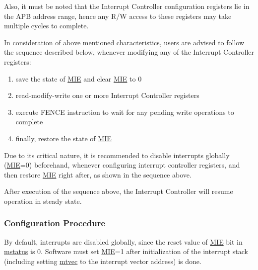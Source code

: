 \documentclass[main\_\_EN.tex]{subfiles}
\begin{document}
Also, it must be noted that the Interrupt Controller configuration registers lie in the APB address range, hence any R/W access to these registers may take multiple cycles to complete.

In consideration of above mentioned characteristics, users are advised to follow the sequence described below, whenever modifying any of the Interrupt Controller registers: 
\begin{enumerate}
    \item save the state of \hyperref[fielddesc:MSTATUSMIE]{MIE} and clear \hyperref[fielddesc:MSTATUSMIE]{MIE} to 0 
    \item read-modify-write one or more Interrupt Controller registers
    \item execute FENCE instruction to wait for any pending write operations to complete
    \item finally, restore the state of \hyperref[fielddesc:MSTATUSMIE]{MIE}
\end{enumerate}

Due to its critical nature, it is recommended to disable interrupts globally (\hyperref[fielddesc:MSTATUSMIE]{MIE}=0) beforehand, whenever configuring interrupt controller registers, and then restore \hyperref[fielddesc:MSTATUSMIE]{MIE} right after, as shown in the sequence above.

After execution of the sequence above, the Interrupt Controller will resume operation in steady state.

\subsubsection{Configuration Procedure}
\label{sec:riscvcpu-int-config}

By default, interrupts are disabled globally, since the reset value of \hyperref[fielddesc:MSTATUSMIE]{MIE} bit in \hyperref[regdesc:MSTATUS]{mstatus} is 0. Software must set \hyperref[fielddesc:MSTATUSMIE]{MIE}=1 after initialization of the interrupt stack (including setting \hyperref[regdesc:MTVEC]{mtvec} to the interrupt vector address) is done.
\end{document}
